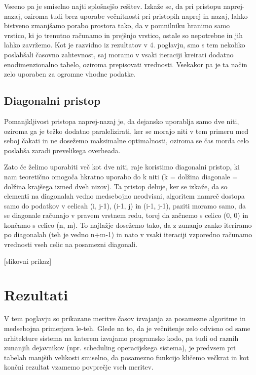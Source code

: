 \documentclass[a4paper,12pt,openright]{book}
\begin{document}
Vseeno pa je smiselno najti splošnejšo rešitev. Izkaže se, da pri pristopu naprej-nazaj, oziroma tudi brez uporabe večnitnosti pri pristopih naprej in nazaj, lahko bistveno zmanjšamo porabo prostora tako, da v pomnilniku hranimo samo vrstico, ki jo trenutno računamo in prejšnjo vrstico, ostale so nepotrebne in jih lahko zavržemo. Kot je razvidno iz rezultatov v 4. poglavju, smo s tem nekoliko poslabšali časovno zahtevnost, saj moramo v vsaki iteraciji kreirati dodatno enodimenzionalno tabelo, oziroma prepisovati vrednosti. Vsekakor pa je ta način zelo uporaben za ogromne vhodne podatke. 

\section{Diagonalni pristop}

Pomanjkljivost pristopa naprej-nazaj je, da dejansko uporablja samo dve niti, oziroma ga je težko dodatno paralelizirati, ker se morajo niti v tem primeru med seboj čakati in ne dosežemo maksimalne optimalnosti, oziroma se čas morda celo poslabša zaradi prevelikega overheada. 

Zato če želimo uporabiti več kot dve niti, raje koristimo diagonalni pristop, ki nam teoretično omogoča hkratno uporabo do k niti (k = dolžina diagonale = dolžina krajšega izmed dveh nizov). Ta pristop deluje, ker se izkaže, da so elementi na diagonalah vedno medsebojno neodvisni, algoritem namreč dostopa samo do podatkov v celicah (i, j-1), (i-1, j) in (i-1, j-1), paziti moramo samo, da se diagonale računajo v pravem vrstnem redu, torej da začnemo s celico (0, 0) in končamo s celico (n, m). To najlažje dosežemo tako, da z zunanjo zanko iteriramo po diagonalah (teh je vedno n+m-1) in nato v vsaki iteraciji vzporedno računamo vrednosti vseh celic na posamezni diagonali. 

[slikovni prikaz]











\chapter{Rezultati}

V tem poglavju so prikazane meritve časov izvajanja za posamezne algoritme in medsebojna primerjava le-teh. Glede na to, da je večnitenje zelo odvisno od same arhitekture sistema na katerem izvajamo programsko kodo, pa tudi od raznih zunanjih dejavnikov (npr. scheduling operacijskega sistema), je predvsem pri tabelah manjših velikosti smiselno, da posamezno funkcijo kličemo večkrat in kot končni rezultat vzamemo povprečje vseh meritev. 
\end{document}
